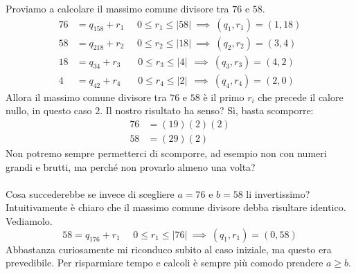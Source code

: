 \begin{esempio}
	Proviamo a calcolare il massimo comune divisore tra $76$ e $58$.
	\begin{align*}
		76 &= q_158 + r_1 \ \ \ \ \ \ 0 \leq r_1 \leq |58| \ \implies \ (q_1,r_1)=(1,18)\\
		58 &= q_218 + r_2 \ \ \ \ \ \ 0 \leq r_2 \leq |18| \ \implies \ (q_2,r_2)=(3,4)\\
		18 &= q_34 + r_3 \ \ \ \ \ \ \ \ 0 \leq r_3 \leq |4| \ \ \implies \ (q_3,r_3)=(4,2)\\
		4 &= q_42 + r_4 \ \ \ \ \ \ \ \ 0 \leq r_4 \leq |2| \ \ \implies \ (q_4,r_4)=(2,0)
	\end{align*}
	Allora il massimo comune divisore tra $76$ e $58$ è il primo $r_i$ che precede il calore nullo, in questo caso $2$. Il nostro risultato ha senso? Sì, basta scomporre:
	\begin{align*}
	76 &=(19)(2)(2)\\
	58&=(29)(2)
	\end{align*}
	Non potremo sempre permetterci di scomporre, ad esempio non con numeri grandi e brutti, ma perché non provarlo almeno una volta? \\ \\ Cosa succederebbe se invece di scegliere $a=76$ e $b=58$ li invertissimo? Intuitivamente è chiaro che il massimo comune divisore debba risultare identico. Vediamolo.
	\begin{equation*}
	58 = q_176 + r_1 \ \ \ \ \ \ 0 \leq r_1 \leq |76| \ \implies \ (q_1,r_1)=(0,58)
	\end{equation*}
	Abbastanza curiosamente mi riconduco subito al caso iniziale, ma questo era prevedibile. Per risparmiare tempo e calcoli è sempre più comodo prendere $a\geq b$.
\end{esempio}



